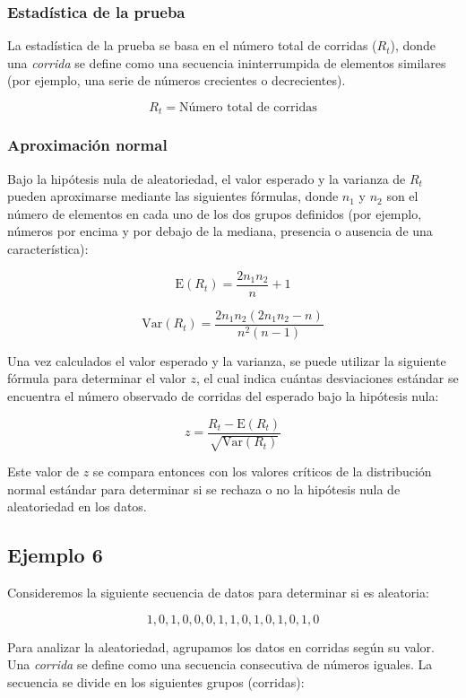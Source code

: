 \documentclass{article}
\begin{document}
\subsubsection*{Estadística de la prueba}


La estadística de la prueba se basa en el número total de corridas ($R_t$), donde una \textit{corrida} se define como una secuencia ininterrumpida de elementos similares (por ejemplo, una serie de números crecientes o decrecientes).

\[R_t = \text{Número total de corridas}\]

\subsubsection*{Aproximación normal}

Bajo la hipótesis nula de aleatoriedad, el valor esperado y la varianza de $R_t$ pueden aproximarse mediante las siguientes fórmulas, donde $n_1$ y $n_2$ son el número de elementos en cada uno de los dos grupos definidos (por ejemplo, números por encima y por debajo de la mediana, presencia o ausencia de una característica):

\[\text{E}(R_t) = \frac{2n_1n_2}{n} + 1\]

\[\text{Var}(R_t) = \frac{2n_1n_2(2n_1n_2-n)}{n^2(n-1)}\]

Una vez calculados el valor esperado y la varianza, se puede utilizar la siguiente fórmula para determinar el valor \(z\), el cual indica cuántas desviaciones estándar se encuentra el número observado de corridas del esperado bajo la hipótesis nula:

\[z = \frac{R_t - \text{E}(R_t)}{\sqrt{\text{Var}(R_t)}}\]

Este valor de \(z\) se compara entonces con los valores críticos de la distribución normal estándar para determinar si se rechaza o no la hipótesis nula de aleatoriedad en los datos.

\subsection*{Ejemplo 6}


Consideremos la siguiente secuencia de datos para determinar si es aleatoria:

\[1, 0, 1, 0, 0, 0, 1, 1, 0, 1, 0, 1, 0, 1, 0\]

Para analizar la aleatoriedad, agrupamos los datos en corridas según su valor. Una \textit{corrida} se define como una secuencia consecutiva de números iguales. La secuencia se divide en los siguientes grupos (corridas):
\end{document}
